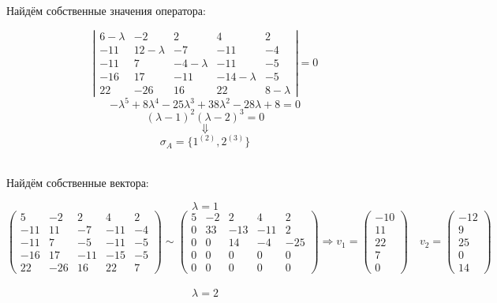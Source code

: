 \documentclass{article}
\begin{document}
\begin{center}
Найдём собственные значения оператора:
\end{center}
$$\left|\begin{matrix}
6-\lambda & -2 & 2 & 4 & 2 \\
-11 & 12-\lambda & -7 & -11 & -4 \\
-11 & 7 & -4-\lambda & -11 & -5\\
-16 & 17 & -11 & -14-\lambda & -5 \\
22 & -26 & 16 & 22 & 8-\lambda
\end{matrix}\right| = 0$$
$$-\lambda^5+8\lambda^4-25\lambda^3+38\lambda^2-28\lambda+8 = 0$$
$$(\lambda-1)^2(\lambda-2)^3=0$$
$$\Downarrow$$
$$\sigma_A = \{1^{(2)},2^{(3)}\}$$ \\
\begin{center}
Найдём собственные вектора:
\end{center}
$$\lambda = 1$$
$$\begin{pmatrix}
5 & -2 & 2 & 4 & 2 \\
-11 & 11 & -7 & -11 & -4 \\
-11 & 7 & -5 & -11 & -5\\
-16 & 17 & -11 & -15 & -5 \\
22 & -26 & 16 & 22 & 7
\end{pmatrix} \sim \begin{pmatrix}
5 & -2 & 2 & 4 & 2 \\
0 & 33 & -13 & -11 & 2 \\
0 & 0 & 14 & -4 & -25\\
0 & 0 & 0 & 0 & 0 \\
0 & 0 & 0 & 0 & 0
\end{pmatrix} \Rightarrow v_1 = \begin{pmatrix}
-10 \\ 11 \\ 22 \\ 7 \\ 0
\end{pmatrix} \quad v_2 = \begin{pmatrix}
-12 \\ 9 \\ 25 \\ 0 \\ 14
\end{pmatrix}$$\\
$$\lambda = 2$$
\end{document}
